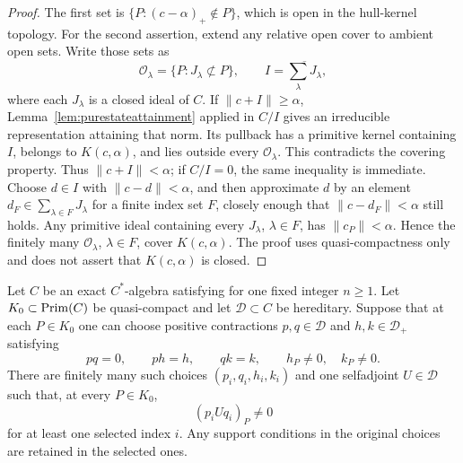\begin{proof}
The first set is $\{P:(c-\alpha)_+\notin P\}$, which is open in
the hull-kernel topology.  For the second assertion, extend any
relative open cover to ambient open sets.  Write those sets as
\[
 \mathcal O_\lambda=\{P:J_\lambda\not\subset P\},
 \qquad I=\overline{\sum_\lambda J_\lambda},
\]
where each $J_\lambda$ is a closed ideal of $C$.
If $\|c+I\|\ge\alpha$, Lemma~\ref{lem:purestateattainment}
applied in $C/I$ gives an irreducible representation attaining that
norm.  Its pullback has a primitive kernel containing $I$, belongs
to $K(c,\alpha)$, and lies outside every $\mathcal O_\lambda$.
This contradicts the covering property.  Thus
$\|c+I\|<\alpha$; if $C/I=0$, the same inequality is immediate.
Choose $d\in I$ with $\|c-d\|<\alpha$, and then approximate $d$
by an element
$d_F\in\sum_{\lambda\in F}J_\lambda$ for a finite index set
$F$, closely enough that $\|c-d_F\|<\alpha$ still holds.
Any primitive ideal containing every $J_\lambda$, $\lambda\in F$,
has $\|c_P\|<\alpha$.  Hence the finitely many
$\mathcal O_\lambda$, $\lambda\in F$, cover $K(c,\alpha)$.
The proof uses quasi-compactness only and does not assert that
$K(c,\alpha)$ is closed.
\end{proof}

\begin{lemma}\label{lem:finite-coupling}
Let $C$ be an exact $C^*$-algebra satisfying \propF{} for one fixed
integer $n\geq1$.  Let $K_0\subset\operatorname{Prim}(C)$ be quasi-compact and let
$\mathcal D\subset C$ be hereditary.  Suppose that at each
$P\in K_0$ one can choose positive contractions $p,q\in\mathcal D$
and $h,k\in\mathcal D_+$ satisfying
\[
 pq=0,\qquad ph=h,\qquad qk=k,\qquad h_P\ne0,\quad k_P\ne0.
\]
There are finitely many such choices $(p_i,q_i,h_i,k_i)$ and one
selfadjoint $U\in\mathcal D$ such that, at every $P\in K_0$,
\[
 (p_iUq_i)_P\ne0
\]
for at least one selected index $i$.  Any support conditions in
the original choices are retained in the selected ones.
\end{lemma}

